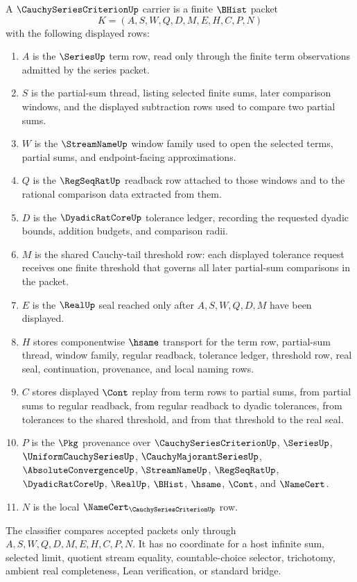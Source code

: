 \begin{definition}\label{def:cauchy-series-criterion-carrier}
A $\CauchySeriesCriterionUp$ carrier is a finite $\BHist$ packet
$$
K=(A,S,W,Q,D,M,E,H,C,P,N)
$$
with the following displayed rows:
\begin{enumerate}
\item $A$ is the $\SeriesUp$ term row, read only through the finite term observations admitted by the series packet.
\item $S$ is the partial-sum thread, listing selected finite sums, later comparison windows, and the displayed subtraction rows used to compare two partial sums.
\item $W$ is the $\StreamNameUp$ window family used to open the selected terms, partial sums, and endpoint-facing approximations.
\item $Q$ is the $\RegSeqRatUp$ readback row attached to those windows and to the rational comparison data extracted from them.
\item $D$ is the $\DyadicRatCoreUp$ tolerance ledger, recording the requested dyadic bounds, addition budgets, and comparison radii.
\item $M$ is the shared Cauchy-tail threshold row: each displayed tolerance request receives one finite threshold that governs all later partial-sum comparisons in the packet.
\item $E$ is the $\RealUp$ seal reached only after $A,S,W,Q,D,M$ have been displayed.
\item $H$ stores componentwise $\hsame$ transport for the term row, partial-sum thread, window family, regular readback, tolerance ledger, threshold row, real seal, continuation, provenance, and local naming rows.
\item $C$ stores displayed $\Cont$ replay from term rows to partial sums, from partial sums to regular readback, from regular readback to dyadic tolerances, from tolerances to the shared threshold, and from that threshold to the real seal.
\item $P$ is the $\Pkg$ provenance over $\CauchySeriesCriterionUp$, $\SeriesUp$, $\UniformCauchySeriesUp$, $\CauchyMajorantSeriesUp$, $\AbsoluteConvergenceUp$, $\StreamNameUp$, $\RegSeqRatUp$, $\DyadicRatCoreUp$, $\RealUp$, $\BHist$, $\hsame$, $\Cont$, and $\NameCert$.
\item $N$ is the local $\NameCert_{\CauchySeriesCriterionUp}$ row.
\end{enumerate}
The classifier compares accepted packets only through $A,S,W,Q,D,M,E,H,C,P,N$. It has no coordinate for a host infinite sum, selected limit, quotient stream equality, countable-choice selector, trichotomy, ambient real completeness, Lean verification, or standard bridge.
\end{definition}

